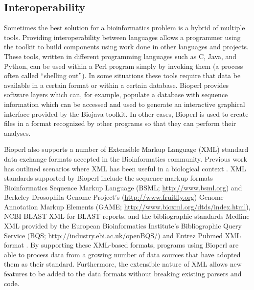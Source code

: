 \documentclass[12pt]{article}
\begin{document}
\subsection{Interoperability}

Sometimes the best solution for a bioinformatics problem is a hybrid
of multiple tools.  Providing interoperability between languages
allows a programmer using the toolkit to build components using work
done in other languages and projects.  These tools, written in
different programming languages such as C, Java, and Python, can be
used within a Perl program simply by invoking them (a process often
called ``shelling out'').  In some situations these tools require that
data be available in a certain format or within a certain database.
Bioperl provides software layers which can, for example, populate a
database with sequence information which can be accessed and used to
generate an interactive graphical interface provided by the Biojava
toolkit.  In other cases, Bioperl is used to create files in a format
recognized by other programs so that they can perform their analyses.

Bioperl also supports a number of Extensible Markup Language (XML)
standard data exchange formats accepted in the Bioinformatics
community.  Previous work has outlined scenarios where XML has been
useful in a biological context \cite{xmlbioinformatics}.  XML
standards supported by Bioperl include the sequence markup formats
Bioinformatics Sequence Markup Language (BSML;
\url{http://www.bsml.org}) and Berkeley Drosophila Genome Project's
(\url{http://www.fruitfly.org}) Genome Annotation Markup Elements
(GAME; \url{http://www.bioxml.org/dtds/index.html}), NCBI BLAST XML
for BLAST reports, and the bibliographic standards Medline XML
provided by the European Bioinformatics Institute's Bibliographic
Query Service (BQS; \url{http://industry.ebi.ac.uk/openBQS/}) and
Entrez Pubmed XML format \cite{entrez}.  By supporting these XML-based
formats, programs using Bioperl are able to process data from a
growing number of data sources that have adopted them as their standard.
Furthermore, the extensible nature of XML allows new features to be added
to the data formats without breaking existing parsers and code.
\end{document}
